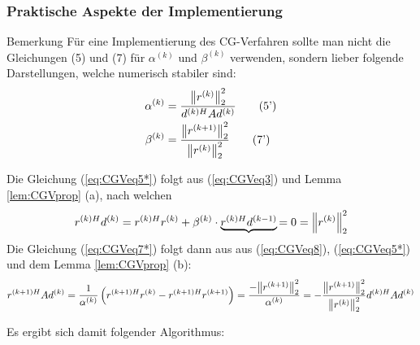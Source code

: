 \subsubsection{Praktische Aspekte der Implementierung}
\begin{colbox}{Bemerkung}
  Für eine Implementierung des CG-Verfahren sollte man nicht die Gleichungen (5) und (7) für $\alpha^{(k)}$ 
  und $\beta^{(k)}$ verwenden, sondern lieber folgende Darstellungen, welche numerisch stabiler sind:
  \begin{align*}
    \alpha^{(k)} &= \dfrac{\vertn{2}{r^{(k)}}_2^2}{{d^{(k)H}}Ad^{(k)}} \tag{5'}\label{eq:CGVeq5*} \\
    \beta^{(k)} &= \dfrac{\vertn{2}{r^{(k+1)}}_2^2}{\vertn{2}{r^{(k)}}_2^2} \tag{7'}\label{eq:CGVeq7*}
  \end{align*}
\end{colbox}
Die Gleichung (\ref{eq:CGVeq5*}) folgt aus (\ref{eq:CGVeq3}) und Lemma \ref{lem:CGVprop} (a), nach welchen
%
\begin{align*}
  {r^{(k)H}}d^{(k)} 
  = {r^{(k)H}}r^{(k)} + \beta^{(k)}\cdot \underbrace{{r^{(k)H}}d^{(k-1)}}{=0}
  = \vertn{2}{r^{(k)}}_2^2
\end{align*}
%
Die Gleichung (\ref{eq:CGVeq7*}) folgt dann aus aus (\ref{eq:CGVeq8}), (\ref{eq:CGVeq5*}) 
und dem Lemma \ref{lem:CGVprop} (b):
%
\begin{align*}
  {r^{(k+1)H}}Ad^{(k)} 
  = \dfrac{1}{\alpha^{(k)}}\left({r^{(k+1)H}}r^{(k)} - {r^{(k+1)H}}r^{(k+1)}\right) 
  =\dfrac{-\vertn{2}{r^{(k+1)}}_2^2}{\alpha^{(k)}} 
  = -\dfrac{\vertn{2}{r^{(k+1)}}_2^2}{\vertn{2}{r^{(k)}}_2^2}{d^{(k)H}}Ad^{(k)}
\end{align*} 

Es ergibt sich damit folgender Algorithmus:


